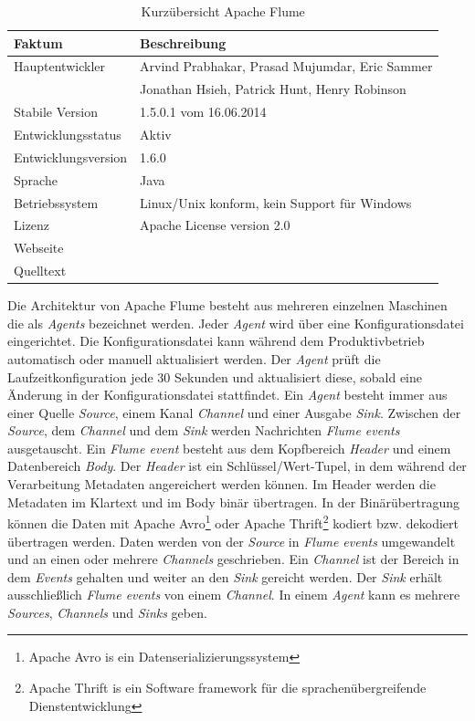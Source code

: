 \begin{table}[tbp]
	\centering
		\begin{tabular}{@{}ll@{}} \toprule
			\textbf{Faktum} & \textbf{Beschreibung} \\ \midrule
			Hauptentwickler & Arvind Prabhakar, Prasad Mujumdar, Eric Sammer \\
			& Jonathan Hsieh, Patrick Hunt, Henry Robinson \\
			Stabile Version & 1.5.0.1 vom 16.06.2014 \\ 
			Entwicklungsstatus &  Aktiv \\
			Entwicklungsversion & 1.6.0 \\
			Sprache & Java \\
			Betriebssystem & Linux/Unix konform, kein Support für Windows  \\
			Lizenz & Apache License version 2.0 \\
			Webseite & \citeint{flume:home} \\
			Quelltext & \citeint{flume:GitHubApacheMirror} \\			
			\bottomrule			
		\end{tabular}
	\caption{Kurzübersicht Apache Flume}
	\label{tab:vorflume}
\end{table}


Die Architektur von Apache Flume besteht aus mehreren einzelnen Maschinen die als \textit{Agents} bezeichnet werden. Jeder \textit{Agent} wird über eine Konfigurationsdatei eingerichtet. Die Konfigurationsdatei kann während dem Produktivbetrieb automatisch oder manuell aktualisiert werden. Der \textit{Agent} prüft die Laufzeitkonfiguration jede 30 Sekunden und aktualisiert diese, sobald eine Änderung in der Konfigurationsdatei stattfindet. Ein \textit{Agent} besteht immer aus einer Quelle \textit{Source}, einem Kanal \textit{Channel} und einer Ausgabe \textit{Sink}. Zwischen der \textit{Source}, dem \textit{Channel} und dem \textit{Sink} werden Nachrichten \textit{Flume events} ausgetauscht. Ein \textit{Flume event} besteht aus dem Kopfbereich \textit{Header} und einem Datenbereich \textit{Body}. Der \textit{Header} ist ein Schlüssel/Wert-Tupel, in dem während der Verarbeitung Metadaten angereichert werden können. Im Header werden die Metadaten im Klartext und im Body binär übertragen. In der Binärübertragung können die Daten mit Apache Avro\footnote{Apache Avro is ein Datenserializierungssystem } oder Apache Thrift\footnote{Apache Thrift is ein Software framework für die sprachenübergreifende Dienstentwicklung } kodiert bzw. dekodiert übertragen werden. Daten werden von der \textit{Source} in \textit{Flume events} umgewandelt und an einen oder mehrere \textit{Channels} geschrieben. Ein \textit{Channel} ist der Bereich in dem \textit{Events} gehalten und weiter an den \textit{Sink} gereicht werden. Der \textit{Sink} erhält ausschließlich \textit{Flume events} von einem \textit{Channel}. In einem \textit{Agent} kann es mehrere \textit{Sources}, \textit{Channels} und \textit{Sinks} geben. 

